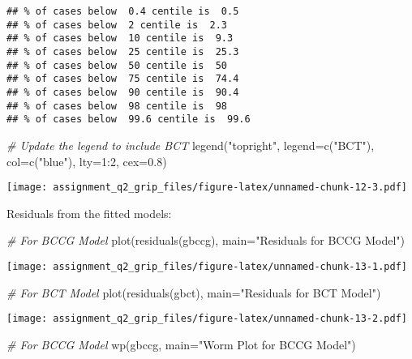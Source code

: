 \documentclass[
]{article}
\newenvironment{Shaded}{\begin{snugshade}}{\end{snugshade}}
\newcommand{\AttributeTok}[1]{\textcolor[rgb]{0.77,0.63,0.00}{#1}}
\newcommand{\CommentTok}[1]{\textcolor[rgb]{0.56,0.35,0.01}{\textit{#1}}}
\newcommand{\DecValTok}[1]{\textcolor[rgb]{0.00,0.00,0.81}{#1}}
\newcommand{\FloatTok}[1]{\textcolor[rgb]{0.00,0.00,0.81}{#1}}
\newcommand{\FunctionTok}[1]{\textcolor[rgb]{0.00,0.00,0.00}{#1}}
\newcommand{\NormalTok}[1]{#1}
\newcommand{\SpecialCharTok}[1]{\textcolor[rgb]{0.00,0.00,0.00}{#1}}
\newcommand{\StringTok}[1]{\textcolor[rgb]{0.31,0.60,0.02}{#1}}
\begin{document}
\begin{verbatim}
## % of cases below  0.4 centile is  0.5 
## % of cases below  2 centile is  2.3 
## % of cases below  10 centile is  9.3 
## % of cases below  25 centile is  25.3 
## % of cases below  50 centile is  50 
## % of cases below  75 centile is  74.4 
## % of cases below  90 centile is  90.4 
## % of cases below  98 centile is  98 
## % of cases below  99.6 centile is  99.6
\end{verbatim}

\begin{Shaded}
\begin{Highlighting}[]
\CommentTok{\# Update the legend to include BCT}
\FunctionTok{legend}\NormalTok{(}\StringTok{"topright"}\NormalTok{, }\AttributeTok{legend=}\FunctionTok{c}\NormalTok{(}\StringTok{"BCT"}\NormalTok{), }\AttributeTok{col=}\FunctionTok{c}\NormalTok{(}\StringTok{"blue"}\NormalTok{), }\AttributeTok{lty=}\DecValTok{1}\SpecialCharTok{:}\DecValTok{2}\NormalTok{, }\AttributeTok{cex=}\FloatTok{0.8}\NormalTok{)}
\end{Highlighting}
\end{Shaded}

\texttt{[image: assignment\_q2\_grip\_files/figure-latex/unnamed-chunk-12-3.pdf]}

Residuals from the fitted models:

\begin{Shaded}
\begin{Highlighting}[]
\CommentTok{\# For BCCG Model}
\FunctionTok{plot}\NormalTok{(}\FunctionTok{residuals}\NormalTok{(gbccg), }\AttributeTok{main=}\StringTok{"Residuals for BCCG Model"}\NormalTok{)}
\end{Highlighting}
\end{Shaded}

\texttt{[image: assignment\_q2\_grip\_files/figure-latex/unnamed-chunk-13-1.pdf]}

\begin{Shaded}
\begin{Highlighting}[]
\CommentTok{\# For BCT Model}
\FunctionTok{plot}\NormalTok{(}\FunctionTok{residuals}\NormalTok{(gbct), }\AttributeTok{main=}\StringTok{"Residuals for BCT Model"}\NormalTok{)}
\end{Highlighting}
\end{Shaded}

\texttt{[image: assignment\_q2\_grip\_files/figure-latex/unnamed-chunk-13-2.pdf]}

\begin{Shaded}
\begin{Highlighting}[]
\CommentTok{\# For BCCG Model}
\FunctionTok{wp}\NormalTok{(gbccg, }\AttributeTok{main=}\StringTok{"Worm Plot for BCCG Model"}\NormalTok{)}
\end{Highlighting}
\end{Shaded}
\end{document}

